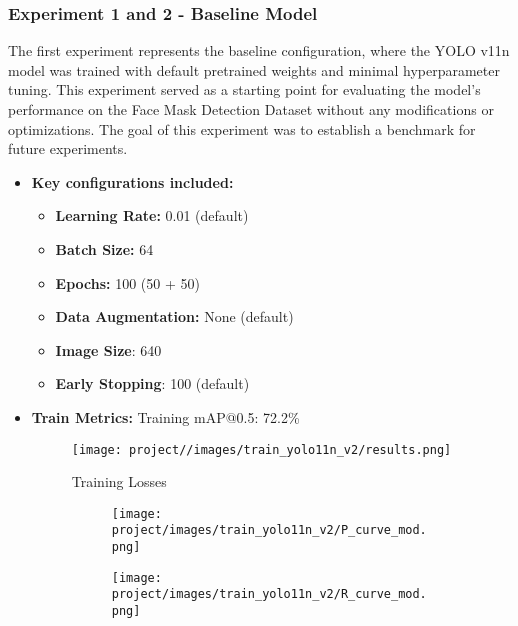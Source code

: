\documentclass[11pt]{article}
\begin{document}
\subsubsection{Experiment 1 and 2 - Baseline Model}
The first experiment represents the baseline configuration, where the YOLO v11n model was trained with default pretrained weights and minimal hyperparameter tuning. This experiment served as a starting point for evaluating the model's performance on the Face Mask Detection Dataset without any modifications or optimizations. The goal of this experiment was to establish a benchmark for future experiments.

\begin{itemize}
    \item \textbf{Key configurations included:}   
    \begin{itemize} 
        \item \textbf{Learning Rate:} 0.01 (default) 
        \item \textbf{Batch Size:} 64 \item \textbf{Epochs:} 100 (50 + 50) 
        \item \textbf{Data Augmentation:} None (default)
        \item \textbf{Image Size}: 640
        \item \textbf{Early Stopping}: 100 (default)
    \end{itemize}

    \item \textbf{Train Metrics:} Training mAP@0.5: 72.2\% 

        \begin{figure}[H]
            \centering
            \caption{Training Losses}
            \label{fig:enter-label}
            \texttt{[image: project//images/train\_yolo11n\_v2/results.png]} %
        \end{figure}

        \begin{figure}[H]
            \centering
            \caption{Comparison of Precision and Recall Confidence Curve}
            \label{fig:set1}
            \begin{subfigure}[b]{0.48\textwidth} %
                \centering
                \texttt{[image: project/images/train\_yolo11n\_v2/P\_curve\_mod.png]}
            \end{subfigure}
            \hspace{0.02\textwidth} %
            \begin{subfigure}[b]{0.48\textwidth} %
                \centering
                \texttt{[image: project/images/train\_yolo11n\_v2/R\_curve\_mod.png]}
            \end{subfigure}
        \end{figure}


\end{itemize}
\end{document}
